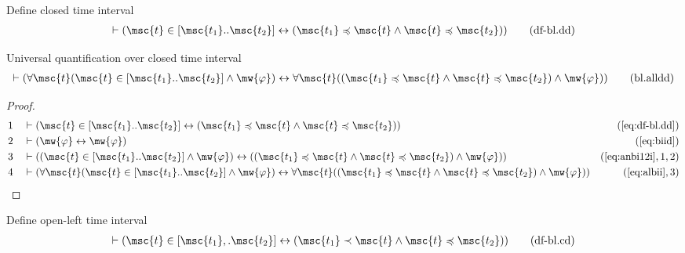 \begin{metadefinition} {Define closed time interval}
\begin{align}
\vdash ( \msc{t} \in [ \msc{t_1} .. \msc{t_2} ] \leftrightarrow ( \msc{t_1}
    \preccurlyeq \msc{t} \wedge \msc{t} \preccurlyeq \msc{t_2} )
    )\label{eq:df-bl.dd}\tag{df-bl.dd}
\end{align}
\end{metadefinition}


\begin{lemma} {Universal quantification over closed time}
interval
\begin{align}
\vdash ( \forall \msc{t} ( \msc{t} \in [ \msc{t_1} .. \msc{t_2} ] \wedge
    \mw{\varphi} ) \leftrightarrow \forall \msc{t} ( ( \msc{t_1} \preccurlyeq
    \msc{t} \wedge \msc{t} \preccurlyeq \msc{t_2} ) \wedge \mw{\varphi} )
    )\label{eq:bl.alldd}\tag{bl.alldd}
\end{align}
\end{lemma}


\begin{proof}
\begin{align}
  1 &&  & \vdash ( \msc{t} \in [ \msc{t_1} .. \msc{t_2} ] \leftrightarrow (
     \msc{t_1} \preccurlyeq \msc{t} \wedge \msc{t}
     \preccurlyeq \msc{t_2} )
     )&(\mbox{\ref{eq:df-bl.dd}})\notag
  \\ 2 &&  & \vdash ( \mw{\varphi} \leftrightarrow \mw{\varphi}
     )&(\mbox{\ref{eq:biid}})\notag
  \\ 3 &&  & \vdash ( ( \msc{t} \in [ \msc{t_1} .. \msc{t_2} ] \wedge
     \mw{\varphi} ) \leftrightarrow ( ( \msc{t_1}
     \preccurlyeq \msc{t} \wedge \msc{t} \preccurlyeq
     \msc{t_2} ) \wedge \mw{\varphi} )
     )&(\mbox{\ref{eq:anbi12i}},1,2)\notag
  \\ 4 &&  & \vdash ( \forall \msc{t} ( \msc{t} \in [ \msc{t_1} .. \msc{t_2} ]
     \wedge \mw{\varphi} ) \leftrightarrow \forall \msc{t}
     ( ( \msc{t_1} \preccurlyeq \msc{t} \wedge \msc{t}
     \preccurlyeq \msc{t_2} ) \wedge \mw{\varphi} )
     )&(\mbox{\ref{eq:albii}},3)\notag
\end{align}
\end{proof}

\begin{metadefinition} {Define open-left time interval}
\begin{align}
\vdash ( \msc{t} \in [ \msc{t_1} ,. \msc{t_2} ] \leftrightarrow ( \msc{t_1}
    \prec \msc{t} \wedge \msc{t} \preccurlyeq \msc{t_2} )
    )\label{eq:df-bl.cd}\tag{df-bl.cd}
\end{align}
\end{metadefinition}


